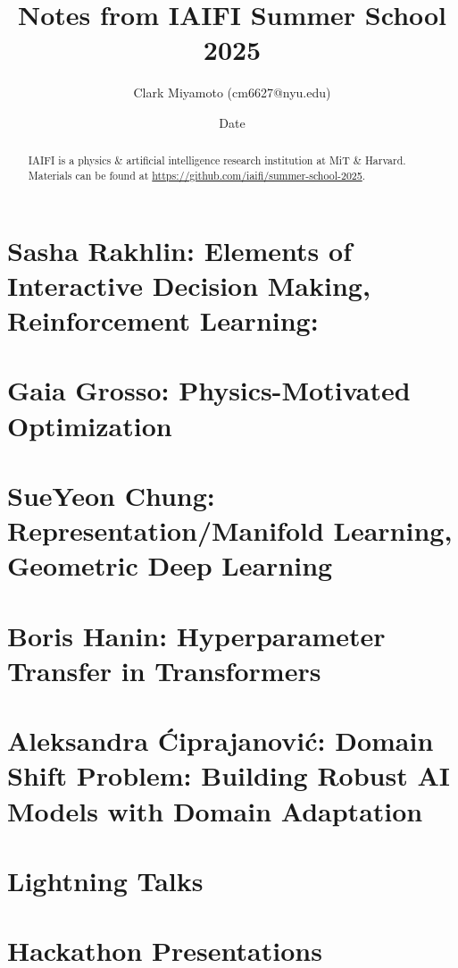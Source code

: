 \documentclass[12pt,fleqn]{article}
\title{Notes from IAIFI Summer School 2025}
\author{Clark Miyamoto (cm6627@nyu.edu)}
\date{Date}
\numberwithin{equation}{section} %
\begin{document}
\maketitle
\begin{abstract}
	IAIFI is a physics \& artificial intelligence research institution at MiT \& Harvard. Materials can be found at \url{https://github.com/iaifi/summer-school-2025}.
\end{abstract}
\tableofcontents



\newpage
\part{Sasha Rakhlin: Elements of Interactive Decision Making, Reinforcement Learning:}


\newpage
\part{Gaia Grosso: Physics-Motivated Optimization}


\newpage
\part{SueYeon Chung: Representation/Manifold Learning, Geometric Deep Learning}


\newpage
\part{Boris Hanin: Hyperparameter Transfer in Transformers}


\newpage
\part{Aleksandra \'Ciprajanovi\'c: Domain Shift Problem: Building Robust AI Models with Domain Adaptation}


\newpage
\part{Lightning Talks}


\newpage
\part{Hackathon Presentations}

\end{document}
